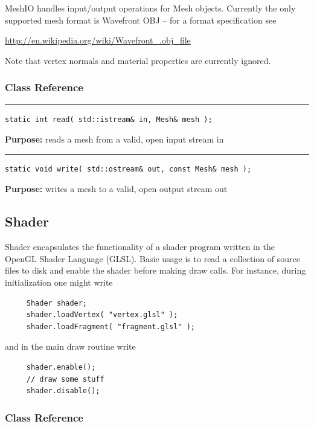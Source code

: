 \documentclass{article}
\begin{document}
 

MeshIO handles input/output operations for Mesh objects.  Currently the only supported mesh format is Wavefront OBJ -- for a format specification see

\url{http://en.wikipedia.org/wiki/Wavefront_.obj_file}

Note that vertex normals and material properties are currently ignored. 



\subsubsection{Class Reference}

\rule{5in}{1pt}
\begin{verbatim}
static int read( std::istream& in, Mesh& mesh );
\end{verbatim}
\textbf{Purpose:}
reads a mesh from a valid, open input stream in

\hspace{-.21in}\rule{5in}{1pt}
\begin{verbatim}
static void write( std::ostream& out, const Mesh& mesh );
\end{verbatim}
\textbf{Purpose:}
writes a mesh to a valid, open output stream out

\pagebreak
\subsection{Shader}

 Shader encapsulates the functionality of a shader program written in the OpenGL Shader Language (GLSL).  Basic usage is to read a collection of source files to disk and enable the shader before making draw calls. For instance, during initialization one might write 

 \begin{verbatim}
     Shader shader;
     shader.loadVertex( "vertex.glsl" );
     shader.loadFragment( "fragment.glsl" );
 \end{verbatim}
\vspace{-\baselineskip} and in the main draw routine write 

 \begin{verbatim}
     shader.enable();
     // draw some stuff
     shader.disable();
 \end{verbatim}
\vspace{-\baselineskip}

\subsubsection{Class Reference}
\end{document}

